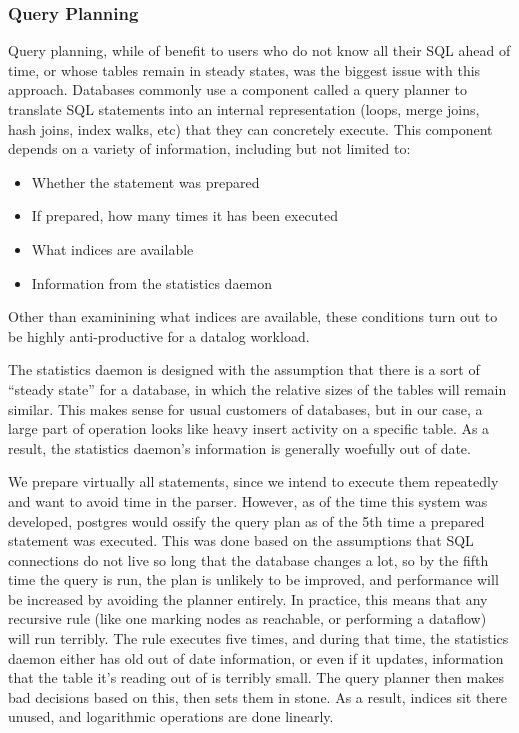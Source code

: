 \subsubsection{Query Planning}
Query planning, while of benefit to users who do not know all their SQL ahead of time, or whose tables remain in steady states, was the biggest issue with this approach.
Databases commonly use a component called a query planner to translate SQL statements into an internal representation (loops, merge joins, hash joins, index walks, etc) that they can concretely execute.
This component depends on a variety of information, including but not limited to:
\begin{itemize}
	\item Whether the statement was prepared
	\item If prepared, how many times it has been executed
	\item What indices are available
	\item Information from the statistics daemon
\end{itemize}
Other than examinining what indices are available, these conditions turn out to be highly anti-productive for a datalog workload.

The statistics daemon is designed with the assumption that there is a sort of ``steady state'' for a database, in which the relative sizes of the tables will remain similar.
This makes sense for usual customers of databases, but in our case, a large part of operation looks like heavy insert activity on a specific table.
As a result, the statistics daemon's information is generally woefully out of date.

We prepare virtually all statements, since we intend to execute them repeatedly and want to avoid time in the parser.
However, as of the time this system was developed, postgres would ossify the query plan as of the 5th time a prepared statement was executed.
This was done based on the assumptions that SQL connections do not live so long that the database changes a lot, so by the fifth time the query is run, the plan is unlikely to be improved, and performance will be increased by avoiding the planner entirely.
In practice, this means that any recursive rule (like one marking nodes as reachable, or performing a dataflow) will run terribly.
The rule executes five times, and during that time, the statistics daemon either has old out of date information, or even if it updates, information that the table it's reading out of is terribly small.
The query planner then makes bad decisions based on this, then sets them in stone.
As a result, indices sit there unused, and logarithmic operations are done linearly.

